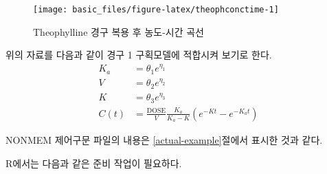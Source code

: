 \documentclass[
  11pt,
  krantz2,
  a4paper]{krantz}
\theoremstyle{definition}
\theoremstyle{definition}
\theoremstyle{definition}
\theoremstyle{remark}
\begin{document}
\begin{figure}

{\centering \texttt{[image: basic\_files/figure-latex/theophconctime-1]} 

}

\caption{Theophylline 경구 복용 후 농도-시간 곡선}\label{fig:theophconctime}
\end{figure}

위의 자료를 다음과 같이 경구 1 구획모델에 적합시켜 보기로 한다.
\begin{equation}
\begin{split}
  K_{a} & = \theta_{1}e^{\eta_{1}} \\
  V & = \theta_{2}e^{\eta_{2}} \\
  K & = \theta_{3}e^{\eta_{3}} \\
  C(t) & = \frac{\text{DOSE}}{V}\frac{K_{a}}{K_{a} - K}(e^{- Kt} - e^{- K_{a}t})
\end{split}
\label{eq:onecompfit}
\end{equation}

NONMEM 제어구문 파일의 내용은 \ref{actual-example}절에서 표시한 것과 같다.

R에서는 다음과 같은 준비 작업이 필요하다.
\small
\end{document}
